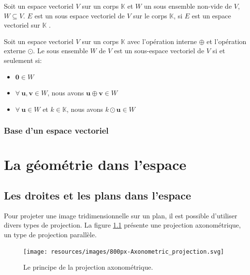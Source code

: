 \documentclass[]{book}
\providecommand{\tightlist}{%
  \setlength{\itemsep}{0pt}\setlength{\parskip}{0pt}}
\theoremstyle{definition}
\theoremstyle{definition}
\theoremstyle{definition}
\theoremstyle{remark}
\let\BeginKnitrBlock\begin \let\EndKnitrBlock\end
\begin{document}
\BeginKnitrBlock{definition}
\protect\hypertarget{def:unnamed-chunk-194}{}{\label{def:unnamed-chunk-194} }Soit un espace vectoriel \(V\) sur un corps \(\mathbb{K}\) et \(W\) un sous ensemble non-vide de \(V\), \(W\subseteq V\). \(E\) est un sous espace vectoriel de \(V\) sur le corps \(\mathbb{K}\), si \(E\) est un espace vectoriel sur \(\mathbb{K}\) .
\EndKnitrBlock{definition}

\BeginKnitrBlock{theorem}
\protect\hypertarget{thm:unnamed-chunk-195}{}{\label{thm:unnamed-chunk-195} }Soit un espace vectoriel \(V\) sur un corps \(\mathbb{K}\) avec l'opération interne \(\oplus\) et l'opération externe \(\odot\). Le sous ensemble \(W\) de \(V\) est un sous-espace vectoriel de \(V\) si et seulement si:

\begin{itemize}
\tightlist
\item
  \(\mathbf{0}\in W\)
\item
  \(\forall\ \mathbf{u},\mathbf{v}\in W\), nous avons \(\mathbf{u}\oplus \mathbf{v}\in W\)
\item
  \(\forall\ \mathbf{u}\in W\) et \(k\in\mathbb{K}\), nous avons \(k\odot \mathbf{u}\in W\)
\end{itemize}
\EndKnitrBlock{theorem}

\hypertarget{base-dun-espace-vectoriel}{%
\section{Base d'un espace vectoriel}\label{base-dun-espace-vectoriel}}

\hypertarget{part-la-guxe9omuxe9trie-dans-lespace}{%
\part{La géométrie dans l'espace}\label{part-la-guxe9omuxe9trie-dans-lespace}}

\hypertarget{droites-plans-espace}{%
\chapter{Les droites et les plans dans l'espace}\label{droites-plans-espace}}

Pour projeter une image tridimensionnelle sur un plan, il est possible d'utiliser divers types de projection. La figure \ref{fig:projection-axonometrique} présente une projection axonométrique, un type de projection parallèle.

\begin{figure}

{\centering \texttt{[image: resources/images/800px-Axonometric\_projection.svg]} 

}

\caption{Le principe de la projection axonométrique.}\label{fig:projection-axonometrique}
\end{figure}
\end{document}
